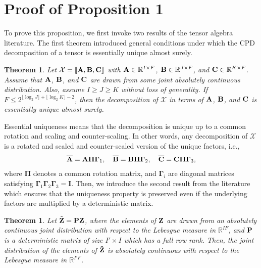 \documentclass[journal]{IEEEtran}
\newcounter{assume}
\newcounter{thm}
\newtheorem{theorem}[thm]{Theorem}
\newcommand{\cpd}[3]{\llbracket #1, #2, #3 \rrbracket}
\newcommand{\A}{{\bf A}}
\newcommand{\B}{{\bf B}}
\newcommand{\C}{{\bf C}}
\newcommand{\Ten}[1]{\mathcal{#1}}
\newcommand{\rev}[1]{{\color{black} #1}} %
\begin{document}
\appendices
\rev{
\section{Proof of Proposition 1}
To prove this proposition, we first invoke two results of the tensor algebra literature. The first theorem introduced general conditions under which the CPD decomposition of a tensor is essentially unique almost surely. 
\begin{theorem}\cite{Chiantini2012}
Let $\Ten{X} = {\cpd{\A}{\B}{\C}}$ with ${\bf A}\in \mathbb{R}^{I\times F}$, ${\bf B}\in \mathbb{R}^{J\times F}$, and ${\bf C}\in \mathbb{R}^{K\times F}$. Assume that ${\bf A}$, ${\bf B}$, and ${\bf C}$ are drawn from some joint absolutely continuous distribution. Also, assume $I \geq J \geq K$ without loss of generality. If $F\leq 2^{\lfloor \log_2 J\rfloor + \lfloor \log_2 K\rfloor -2}$, then the decomposition of $\Ten{X}$ in terms of ${\bf A}$, ${\bf B}$, and ${\bf C}$ is essentially unique almost surely.
\end{theorem}
Essential uniqueness means that the decomposition is unique up to a common rotation and scaling and counter-scaling. In other words, any decomposition of $\Ten{X}$ is a rotated and scaled and counter-scaled version of the unique factors, i.e.,
\begin{align}
    \overline{\bf A} = {\bf A} \boldsymbol{\Pi} \boldsymbol{\Gamma}_1,\quad
    \overline{\bf B} = {\bf B} \boldsymbol{\Pi} \boldsymbol{\Gamma}_2,\quad 
    \overline{\bf C} = {\bf C} \boldsymbol{\Pi} \boldsymbol{\Gamma}_3,
\end{align}
where $\boldsymbol{\Pi}$ denotes a common rotation matrix, and $\boldsymbol{\Gamma}_i$ are diagonal matrices satisfying $\boldsymbol{\Gamma}_1 \boldsymbol{\Gamma}_2 \boldsymbol{\Gamma}_3 = \boldsymbol{I}$. Then, we introduce the second result from the literature which ensures that the uniqueness property is preserved even if the underlying factors are multiplied by a deterministic matrix.
\begin{theorem}\cite{kanatsoulis2018hyperspectral}
Let $\tilde{\bf Z} = {\bf P} {\bf Z} $, where the elements of ${\bf Z}$ are drawn from an absolutely continuous joint distribution with respect to the Lebesgue measure in $\mathbb{R}^{IF}$, and ${\bf P}$ is a deterministic matrix of size $I' \times I$ which has a full row rank. Then, the joint distribution of the elements of $\tilde{\bf Z}$ is absolutely continuous with respect to the Lebesgue measure in $\mathbb{R}^{I'F}$.
\end{theorem}

}
\end{document}
